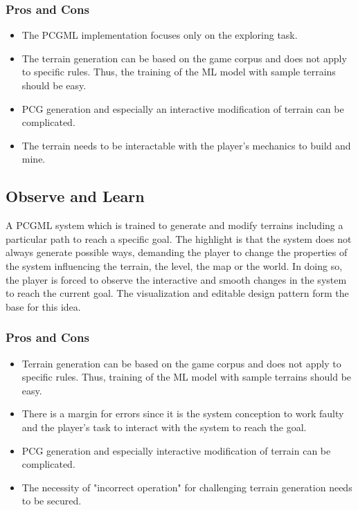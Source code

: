 \documentclass[MGS,Master,english]{twbook}%
\begin{document}
\subsubsection{Pros and Cons}
\begin{itemize}
	\item The \ac{PCGML} implementation focuses only on the exploring task.
	\item The terrain generation can be based on the game corpus and does not apply to specific rules. Thus, the training of the \ac{ML} model with sample terrains should be easy.
	\item \ac{PCG} generation and especially an interactive modification of terrain can be complicated.
	\item The terrain needs to be interactable with the player's mechanics to build and mine.
\end{itemize}


\subsection{Observe and Learn} \label{idea::observeAndLearn}
A \ac{PCGML} system which is trained to generate and modify terrains including a particular path to reach a specific goal. The highlight is that the system does not always generate possible ways, demanding the player to change the properties of the system influencing the terrain, the level, the map or the world. In doing so, the player is forced to observe the interactive and smooth changes in the system to reach the current goal. The visualization and editable design pattern form the base for this idea.

\subsubsection{Pros and Cons}
\begin{itemize}
	\item Terrain generation can be based on the game corpus and does not apply to specific rules. Thus, training of the \ac{ML} model with sample terrains should be easy.
	\item There is a margin for errors since it is the system conception to work faulty and the player's task to interact with the system to reach the goal. 
	\item \ac{PCG} generation and especially interactive modification of terrain can be complicated.
	\item The necessity of "incorrect operation" for challenging terrain generation needs to be secured.
\end{itemize}
\end{document}
